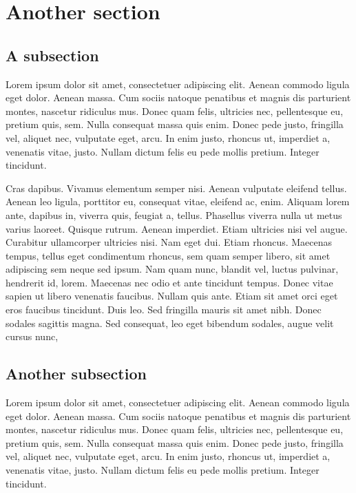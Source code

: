 \documentclass[USenglish]{article}
\begin{document}
\section{Another section} 

\subsection{A subsection} 

Lorem ipsum dolor sit amet, consectetuer adipiscing elit. Aenean commodo ligula eget dolor. Aenean
  massa. Cum sociis natoque penatibus et magnis dis parturient montes, nascetur ridiculus mus. Donec
  quam felis, ultricies nec, pellentesque eu, pretium quis, sem. Nulla consequat massa quis
  enim. Donec pede justo, fringilla vel, aliquet nec, vulputate eget, arcu. In enim justo, rhoncus
  ut, imperdiet a, venenatis vitae, justo. Nullam dictum felis eu pede mollis pretium. Integer
  tincidunt.

  Cras dapibus. Vivamus elementum semper nisi. Aenean vulputate eleifend tellus. Aenean
  leo ligula, porttitor eu, consequat vitae, eleifend ac, enim. Aliquam lorem ante, dapibus in,
  viverra quis, feugiat a, tellus. Phasellus viverra nulla ut metus varius laoreet. Quisque
  rutrum. Aenean imperdiet. Etiam ultricies nisi vel augue. Curabitur ullamcorper ultricies
  nisi. Nam eget dui. Etiam rhoncus. Maecenas tempus, tellus eget condimentum rhoncus, sem quam
  semper libero, sit amet adipiscing sem neque sed ipsum. Nam quam nunc, blandit vel, luctus
  pulvinar, hendrerit id, lorem. Maecenas nec odio et ante tincidunt tempus. Donec vitae sapien ut
  libero venenatis faucibus. Nullam quis ante. Etiam sit amet orci eget eros faucibus
  tincidunt. Duis leo. Sed fringilla mauris sit amet nibh. Donec sodales sagittis magna. Sed
  consequat, leo eget bibendum sodales, augue velit cursus nunc,

\subsection{Another subsection} 

Lorem ipsum dolor sit amet, consectetuer adipiscing elit. Aenean commodo ligula eget dolor. Aenean
  massa. Cum sociis natoque penatibus et magnis dis parturient montes, nascetur ridiculus mus. Donec
  quam felis, ultricies nec, pellentesque eu, pretium quis, sem. Nulla consequat massa quis
  enim. Donec pede justo, fringilla vel, aliquet nec, vulputate eget, arcu. In enim justo, rhoncus
  ut, imperdiet a, venenatis vitae, justo. Nullam dictum felis eu pede mollis pretium. Integer
  tincidunt.
\end{document}
